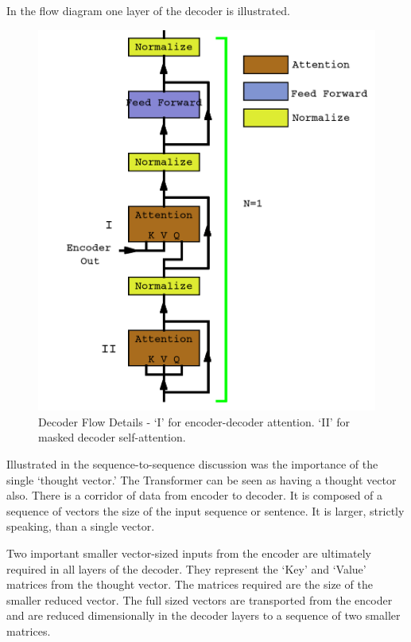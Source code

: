 In the flow diagram one layer of the decoder is illustrated.

\begin{figure}[H]
	\begin{center}
		
		
		\includegraphics[scale=1.25]{diagram-flow-decoder02}
	\end{center}
	\caption[Decoder Flow]{Decoder Flow Details - `I' for encoder-decoder attention. `II' for masked decoder self-attention.}
	
	
\end{figure}


Illustrated in the sequence-to-sequence discussion was the importance of the single `thought vector.' The Transformer can be seen as having a thought vector also. There is a corridor of data from encoder to decoder. It is composed of a sequence of vectors the size of the input sequence or sentence. It is larger, strictly speaking, than a single vector.

Two important smaller vector-sized inputs from the encoder are ultimately required in all layers of the decoder. They represent the `Key' and `Value' matrices from the thought vector. The matrices required are the size of the smaller reduced vector. The full sized vectors are transported from the encoder and are reduced dimensionally in the decoder layers to a sequence of two smaller matrices. 

